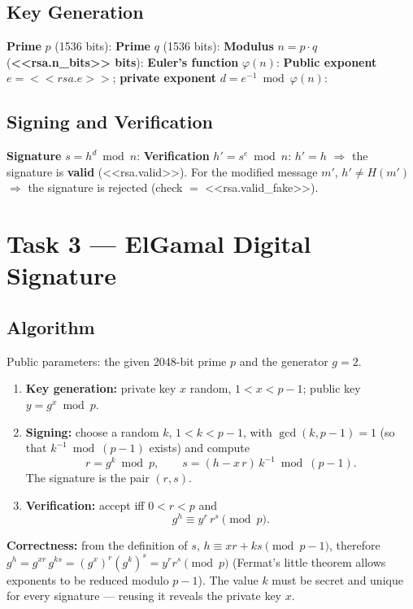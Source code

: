 \documentclass[12pt,a4paper]{article}
\begin{document}
\subsection{Key Generation}
\noindent\textbf{Prime} $p$ (1536 bits):
\noindent\textbf{Prime} $q$ (1536 bits):
\noindent\textbf{Modulus} $n = p\cdot q$ (\textbf{<<rsa.n_bits>> bits}):
\noindent\textbf{Euler's function} $\varphi(n)$:
\noindent\textbf{Public exponent} $e = <<rsa.e>>$; \textbf{private exponent} $d = e^{-1} \bmod \varphi(n)$:

\subsection{Signing and Verification}
\noindent\textbf{Signature} $s = h^{d} \bmod n$:
\noindent\textbf{Verification} $h' = s^{e} \bmod n$:
$h' = h$ $\Rightarrow$ the signature is \textbf{valid} (<<rsa.valid>>). For the modified message
$m'$, $h' \ne H(m')$ $\Rightarrow$ the signature is rejected (check $=$ <<rsa.valid_fake>>).

\section{Task 3 — ElGamal Digital Signature}
\subsection{Algorithm}
Public parameters: the given 2048-bit prime $p$ and the generator $g = 2$.
\begin{enumerate}
  \item \textbf{Key generation:} private key $x$ random, $1 < x < p-1$; public key
        $y = g^{x} \bmod p$.
  \item \textbf{Signing:} choose a random $k$, $1<k<p-1$, with $\gcd(k, p-1) = 1$ (so that
        $k^{-1} \bmod (p-1)$ exists) and compute
        \[ r = g^{k} \bmod p, \qquad s = (h - x\,r)\,k^{-1} \bmod (p-1). \]
        The signature is the pair $(r,s)$.
  \item \textbf{Verification:} accept iff $0<r<p$ and
        \[ g^{h} \equiv y^{r}\, r^{s} \pmod p. \]
\end{enumerate}
\textbf{Correctness:} from the definition of $s$, $h \equiv x r + k s \pmod{p-1}$, therefore
$g^{h} = g^{xr}\,g^{ks} = (g^{x})^{r}(g^{k})^{s} = y^{r} r^{s} \pmod p$ (Fermat's little theorem
allows exponents to be reduced modulo $p-1$). The value $k$ must be secret and unique for every
signature — reusing it reveals the private key $x$.
\end{document}
